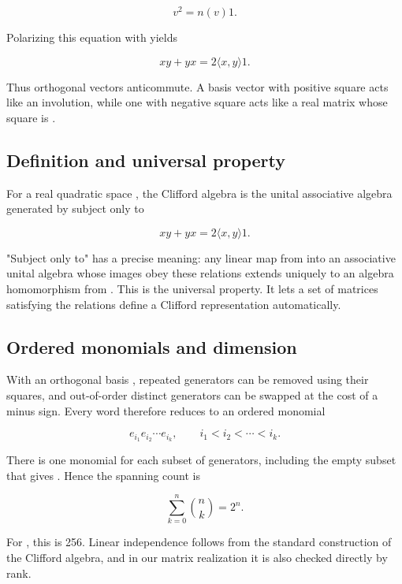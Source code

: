 \documentclass[11pt]{article}
\begin{document}
\[
v^2=n(v)1.
\]

Polarizing this equation with \texttt{} yields

\[
xy+yx=2\langle x,y\rangle1.
\]

Thus orthogonal vectors anticommute. A basis vector with positive square acts like an involution, while one with negative square acts like a real matrix whose square is \texttt{}.

\subsection{Definition and universal property}

For a real quadratic space \texttt{}, the Clifford algebra \texttt{} is the unital associative algebra generated by \texttt{} subject only to

\[
xy+yx=2\langle x,y\rangle1.
\]

"Subject only to" has a precise meaning: any linear map from \texttt{} into an associative unital algebra whose images obey these relations extends uniquely to an algebra homomorphism from \texttt{}. This is the universal property. It lets a set of matrices satisfying the relations define a Clifford representation automatically.

\subsection{Ordered monomials and dimension}

With an orthogonal basis \texttt{}, repeated generators can be removed using their squares, and out-of-order distinct generators can be swapped at the cost of a minus sign. Every word therefore reduces to an ordered monomial

\[
e_{i_1}e_{i_2}\cdots e_{i_k},
\qquad i_1<i_2<\cdots<i_k.
\]

There is one monomial for each subset of \texttt{} generators, including the empty subset that gives \texttt{}. Hence the spanning count is

\[
\sum_{k=0}^{n}\binom{n}{k}=2^n.
\]

For \texttt{}, this is 256. Linear independence follows from the standard construction of the Clifford algebra, and in our matrix realization it is also checked directly by rank.
\end{document}
